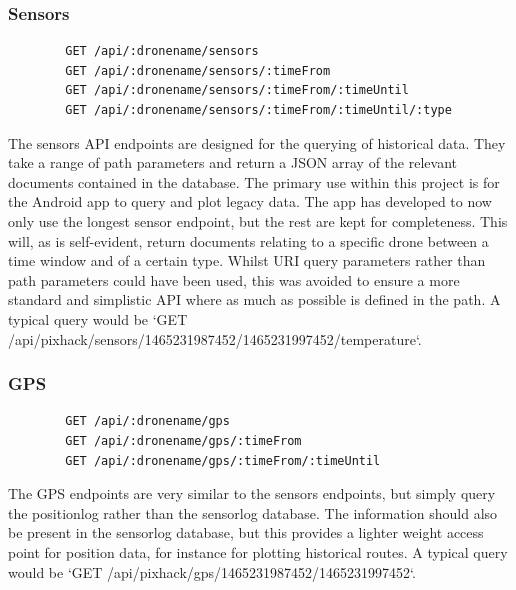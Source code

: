\documentclass{article}
\begin{document}
\subsubsection{Sensors}
\begin{center}
	\begin{lstlisting}
		GET /api/:dronename/sensors
		GET /api/:dronename/sensors/:timeFrom
		GET /api/:dronename/sensors/:timeFrom/:timeUntil
		GET /api/:dronename/sensors/:timeFrom/:timeUntil/:type
	\end{lstlisting}
\end{center}
The sensors API endpoints are designed for the querying of historical data. They take a range of path parameters and return a JSON array of the relevant documents contained in the database. The primary use within this project is for the Android app to query and plot legacy data. The app has developed to now only use the longest sensor endpoint, but the rest are kept for completeness. This will, as is self-evident, return documents relating to a specific drone between a time window and of a certain type. Whilst URI query parameters rather than path parameters could have been used, this was avoided to ensure a more standard and simplistic API where as much as possible is defined in the path. A typical query would be `GET /api/pixhack/sensors/1465231987452/1465231997452/temperature`.

\subsubsection{GPS}
\begin{center}
	\begin{lstlisting}
		GET /api/:dronename/gps
		GET /api/:dronename/gps/:timeFrom
		GET /api/:dronename/gps/:timeFrom/:timeUntil
	\end{lstlisting}
\end{center}
The GPS endpoints are very similar to the sensors endpoints, but simply query the positionlog rather than the sensorlog database. The information should also be present in the sensorlog database, but this provides a lighter weight access point for position data, for instance for plotting historical routes. A typical query would be `GET /api/pixhack/gps/1465231987452/1465231997452`.
\end{document}
